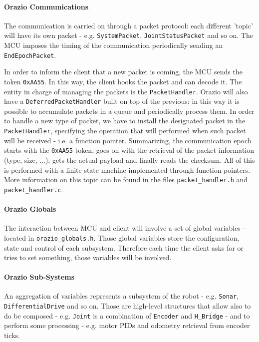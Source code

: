 \documentclass[10pt,a4paper, notitlepage]{report}
\begin{document}
\paragraph{Orazio Communications} The communication is carried on through a packet protocol: each different 'topic' will have its own packet - e.g. \texttt{SystemPacket}, \texttt{JointStatusPacket} and so on. The MCU imposes the timing of the communication periodically sending an \texttt{EndEpochPacket}.

In order to inform the client that a new packet is coming, the MCU sends the token \texttt{0xAA55}. In this way, the client hooks the packet and can decode it. The entity in charge of managing the packets is the \texttt{PacketHandler}. Orazio will also have a \texttt{DeferredPacketHandler} built on top of the previous: in this way it is possible to accumulate packets in a queue and periodically process them. In order to handle a new type of packet, we have to install the designated packet in the \texttt{PacketHandler}, specifying the operation that will performed when such packet will be received - i.e. a function pointer. Summarizing, the communication epoch starts with the \texttt{0xAA55} token, goes on with the retrieval of the packet information (type, size, ...), gets the actual payload and finally reads the checksum. All of this is performed with a finite state machine implemented through function pointers. More information on this topic can be found in the files \texttt{packet\_handler.h} and \texttt{packet\_handler.c}.

\paragraph{Orazio Globals} The interaction between MCU and client will involve a set of global variables - located in \texttt{orazio\_globals.h}. Those global variables store the configuration, state and control of each subsystem. Therefore each time the client asks for or tries to set something, those variables will be involved.

\paragraph{Orazio Sub-Systems} An aggregation of variables represents a subsystem of the robot - e.g. \texttt{Sonar}, \texttt{DifferentialDrive} and so on. Those are high-level structures that allow also to do be composed - e.g. \texttt{Joint} is a combination of \texttt{Encoder} and \texttt{H\_Bridge} - and to perform some processing - e.g. motor PIDs and odometry retrieval from encoder ticks.
\end{document}
